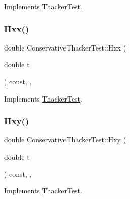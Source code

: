 Implements \hyperlink{classThackerTest_a9a8565b3a9e9bf1e56407d2844bd8517}{Thacker\+Test}.

\mbox{\label{classConservativeThackerTest_a578c112c91fc753f5cd550fca2603f8a}} 
\subsubsection{\texorpdfstring{Hxx()}{Hxx()}}
{\footnotesize\ttfamily double Conservative\+Thacker\+Test\+::\+Hxx (\begin{DoxyParamCaption}\item[{double}]{t }\end{DoxyParamCaption}) const\hspace{0.3cm}{\ttfamily [inline]}, {\ttfamily [override]}, {\ttfamily [virtual]}}



Implements \hyperlink{classThackerTest_a137a136dd1261b4a97a63831841d611b}{Thacker\+Test}.

\mbox{\label{classConservativeThackerTest_a43d5a3defc104c6581cf540e391a2e5e}} 
\subsubsection{\texorpdfstring{Hxy()}{Hxy()}}
{\footnotesize\ttfamily double Conservative\+Thacker\+Test\+::\+Hxy (\begin{DoxyParamCaption}\item[{double}]{t }\end{DoxyParamCaption}) const\hspace{0.3cm}{\ttfamily [inline]}, {\ttfamily [override]}, {\ttfamily [virtual]}}



Implements \hyperlink{classThackerTest_a309f6008f53c7084163ce52cd381efc7}{Thacker\+Test}.

\mbox{\label{classConservativeThackerTest_ae1a06fc8ea9fe64578cd59e0aa7cdcc3}} 
